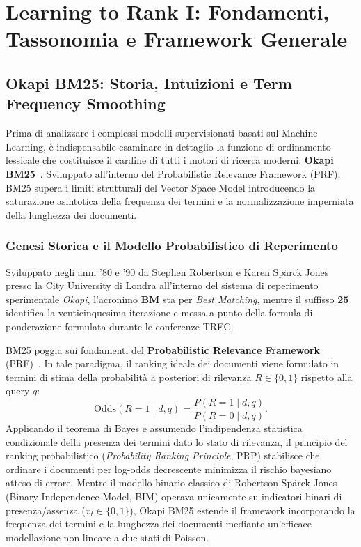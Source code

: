 \chapter{Learning to Rank I: Fondamenti, Tassonomia e Framework Generale}
\label{chap:learning-to-rank-fondamenti}

\FloatBarrier
\section{Okapi BM25: Storia, Intuizioni e Term Frequency Smoothing}
\label{sec:okapi-bm25-fondamenti}

Prima di analizzare i complessi modelli supervisionati basati sul Machine Learning, \`e indispensabile esaminare in dettaglio la funzione di ordinamento lessicale che costituisce il cardine di tutti i motori di ricerca moderni: \textbf{Okapi BM25}~\cite{robertson2009,manning2008}. Sviluppato all'interno del Probabilistic Relevance Framework (PRF), BM25 supera i limiti strutturali del Vector Space Model introducendo la saturazione asintotica della frequenza dei termini e la normalizzazione imperniata della lunghezza dei documenti.

\FloatBarrier
\subsection{Genesi Storica e il Modello Probabilistico di Reperimento}
\label{subsec:bm25-genesi-storica}
Sviluppato negli anni '80 e '90 da Stephen Robertson e Karen Sp\"arck Jones presso la City University di Londra all'interno del sistema di reperimento sperimentale \textit{Okapi}, l'acronimo \textbf{BM} sta per \textit{Best Matching}, mentre il suffisso \textbf{25} identifica la venticinquesima iterazione e messa a punto della formula di ponderazione formulata durante le conferenze TREC.

BM25 poggia sui fondamenti del \textbf{Probabilistic Relevance Framework} (PRF)~\cite{robertson2009}. In tale paradigma, il ranking ideale dei documenti viene formulato in termini di stima della probabilit\`a a posteriori di rilevanza $R \in \{0, 1\}$ rispetto alla query $q$:
\begin{equation}
\text{Odds}(R=1 \mid d, q) = \frac{P(R=1 \mid d, q)}{P(R=0 \mid d, q)}.
\end{equation}
Applicando il teorema di Bayes e assumendo l'indipendenza statistica condizionale della presenza dei termini dato lo stato di rilevanza, il principio del ranking probabilistico (\textit{Probability Ranking Principle}, PRP) stabilisce che ordinare i documenti per log-odds decrescente minimizza il rischio bayesiano atteso di errore. Mentre il modello binario classico di Robertson-Sp\"arck Jones (Binary Independence Model, BIM) operava unicamente su indicatori binari di presenza/assenza ($x_t \in \{0, 1\}$), Okapi BM25 estende il framework incorporando la frequenza dei termini e la lunghezza dei documenti mediante un'efficace modellazione non lineare a due stati di Poisson.

